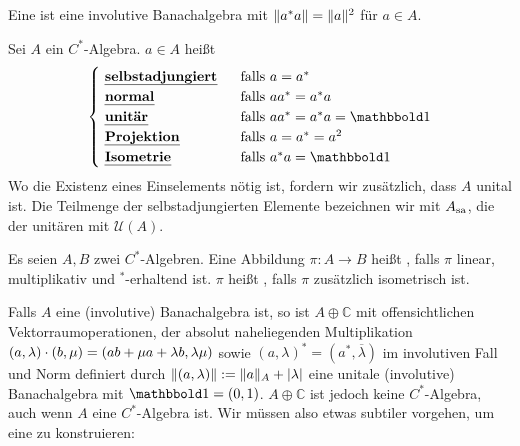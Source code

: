 \begin{definition}[{name=[$C^*$-Algebra]},label=def:22]
	Eine  ist eine involutive Banachalgebra mit $\norm{a^*a}= \norm{a}^2$ für $a \in A$.
\end{definition}

\begin{definition}[{name=[{selbstadjungiert, normal, unitär, Projektion, Isometrie}]}]
	Sei $A$ ein $C^*$-Algebra. $a \in A$ heißt 
	\[
		\begin{cases}
			\text{ \Index{selbstadjungiert} }  &\text{ falls } a=a^*\\
			\text{ \Index{normal} }  &\text{ falls }  aa^*=a^*a \\
			\text{ \Index{unitär} }  &\text{ falls }  aa^*=a^*a=\ind \\
			\text{ \Index{Projektion} }  &\text{ falls }   a=a^*=a^2 \\
			\text{ \Index{Isometrie} }  &\text{ falls } a^*a= \ind  
		\end{cases}
	\]
	Wo die Existenz eines Einselements nötig ist, fordern wir zusätzlich, dass $A$ unital ist.
	Die Teilmenge der selbstadjungierten Elemente bezeichnen wir mit $A_\sa$, die der unitären mit $\mathcal{U}(A)$.
\end{definition}

\begin{definition}[{name=[${ }^*$-Homomorphismus]}]
	Es seien $A,B$ zwei $C^*$-Algebren. Eine Abbildung $\pi \colon A \to B$ heißt , falls $\pi$ 
	linear, multiplikativ und ${}^*$-erhaltend ist. $\pi$ heißt
	, falls $\pi$ zusätzlich isometrisch ist. 
\end{definition}

\begin{bemerkung}[{name=[Direkte Summe von $A$ mit den komplexen Zahlen]}]
	Falls $A$ eine (involutive) Banachalgebra ist, so ist $A \oplus \mathbb{C}$ mit offensichtlichen Vektorraumoperationen, der absolut naheliegenden Multiplikation $(a,\lambda) \cdot (b,\mu) = \enbrace*{ab + \mu a + \lambda b, \lambda \mu}$ sowie $(a,\lambda)^* = (a^*,\overline{\lambda})$ im involutiven Fall und Norm definiert durch
	$\norm{(a,\lambda)}:= \norm{a}_{A} + \abs{\lambda}$ eine unitale (involutive) Banachalgebra mit $\ind=(0,1)$. 
	$A \oplus \mathbb{C}$ ist jedoch keine $C^*$-Algebra, auch wenn $A$ eine $C^*$-Algebra ist.
	Wir müssen also etwas subtiler vorgehen, um eine  zu konstruieren: 
\end{bemerkung}

